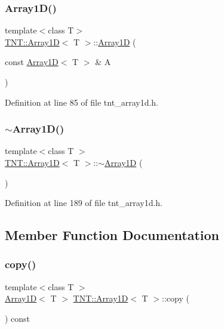 \subsubsection{\texorpdfstring{Array1\+D()}{Array1D()}\hspace{0.1cm}{\footnotesize\ttfamily [5/5]}}
{\footnotesize\ttfamily template$<$class T$>$ \\
\hyperlink{classTNT_1_1Array1D}{T\+N\+T\+::\+Array1D}$<$ T $>$\+::\hyperlink{classTNT_1_1Array1D}{Array1D} (\begin{DoxyParamCaption}\item[{const \hyperlink{classTNT_1_1Array1D}{Array1D}$<$ T $>$ \&}]{A }\end{DoxyParamCaption})\hspace{0.3cm}{\ttfamily [inline]}}



Definition at line 85 of file tnt\+\_\+array1d.\+h.

\mbox{\label{classTNT_1_1Array1D_a3d293188a2c4d0dad2075c747a1560c4}} 
\subsubsection{\texorpdfstring{$\sim$\+Array1\+D()}{~Array1D()}}
{\footnotesize\ttfamily template$<$class T $>$ \\
\hyperlink{classTNT_1_1Array1D}{T\+N\+T\+::\+Array1D}$<$ T $>$\+::$\sim$\hyperlink{classTNT_1_1Array1D}{Array1D} (\begin{DoxyParamCaption}{ }\end{DoxyParamCaption})}



Definition at line 189 of file tnt\+\_\+array1d.\+h.



\subsection{Member Function Documentation}
\mbox{\label{classTNT_1_1Array1D_aa9e24ae360ffeb864304fd58399515c8}} 
\subsubsection{\texorpdfstring{copy()}{copy()}}
{\footnotesize\ttfamily template$<$class T $>$ \\
\hyperlink{classTNT_1_1Array1D}{Array1D}$<$ T $>$ \hyperlink{classTNT_1_1Array1D}{T\+N\+T\+::\+Array1D}$<$ T $>$\+::copy (\begin{DoxyParamCaption}{ }\end{DoxyParamCaption}) const}



